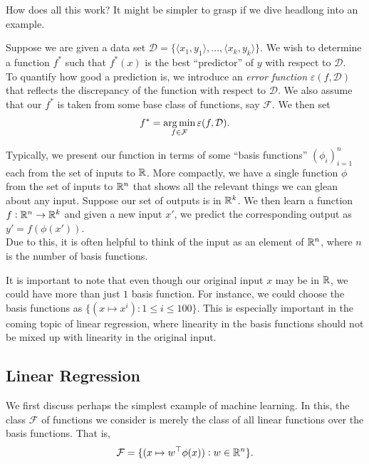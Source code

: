 \documentclass{article}
\begin{document}
		How does all this work? It might be simpler to grasp if we dive headlong into an example.

		Suppose we are given a data set $\mathcal{D} = \{\langle x_1, y_1 \rangle,\ldots,\langle x_k, y_k \rangle\}$. We wish to determine a function $f^*$ such that $f^*(x)$ is the best ``predictor'' of $y$ with respect to $\mathcal{D}$.\\
		To quantify how good a prediction is, we introduce an \emph{error function} $\varepsilon(f,\mathcal{D})$ that reflects the discrepancy of the function with respect to $\mathcal{D}$. We also assume that our $f^*$ is taken from some base class of functions, say $\mathcal{F}$. We then set
		\[ f^* = \operatorname*{arg\,min}_{f \in \mathcal{F}} \varepsilon(f,\mathcal{D}). \]

		Typically, we present our function in terms of some ``basis functions'' $(\phi_i)_{i=1}^n$ each from the set of inputs to $\mathbb{R}$. More compactly, we have a single function $\phi$ from the set of inputs to $\mathbb{R}^n$ that shows all the relevant things we can glean about any input. Suppose our set of outputs is in $\mathbb{R}^k$. We then learn a function $f : \mathbb{R}^n\to\mathbb{R}^k$ and given a new input $x'$, we predict the corresponding output as $y' = f(\phi(x'))$.\\
		Due to this, it is often helpful to think of the input as an element of $\mathbb{R}^n$, where $n$ is the number of basis functions.\\

		\begin{remark}
			It is important to note that even though our original input $x$ may be in $\mathbb{R}$, we could have more than just $1$ basis function. For instance, we could choose the basis functions as $\{ (x\mapsto x^i) : 1 \le i \le 100\}$. This is especially important in the coming topic of linear regression, where linearity in the basis functions should not be mixed up with linearity in the original input.
		\end{remark}
		

	\subsection{Linear Regression}

		We first discuss perhaps the simplest example of machine learning. In this, the class $\mathcal{F}$ of functions we consider is merely the class of all linear functions over the basis functions. That is,
		\[ \mathcal{F} = \{ (x \mapsto w^\top \phi(x) ) : w \in \mathbb{R}^n \}. \]
\end{document}
